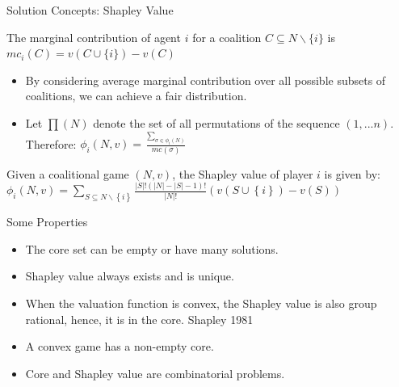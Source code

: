 \documentclass{beamer}
\begin{document}
%
\begin{frame}{Solution Concepts: Shapley Value}
    \begin{definition} \label{dfn:marginalcontribution}
        The {\color{blue}marginal contribution} of agent $i$ for a coalition $C \subseteq N \backslash \{i\}$ is $mc_i(C) = v(C \cup \{i\}) - v(C)$
    \end{definition}

    \begin{itemize}
        \item By considering average marginal contribution over all possible subsets of coalitions, we can achieve a fair distribution.\\
        \item Let $\prod(N)$ denote the set of all permutations of the sequence $(1,...n)$. Therefore: $\phi_i(N,v) = \frac{\sum_{\sigma \in \phi_i(N)}}{mc(\sigma)}$
    \end{itemize}

    \begin{definition} \label{dfn:shapleyvalue}
        Given a coalitional game $(N,v)$, the Shapley value of player $i$ is given by: \\
        $\phi_i(N,v) = \sum_{S \subseteq N \backslash \left\{i\right\} } \frac{|S|! (|N|-|S|-1)!}{|N|!} (v(S \cup \left\{i\right\}) - v(S))$
    \end{definition}
\end{frame}
\begin{frame}{Some Properties}
    \begin{itemize}
        \item The core set can be empty or have many solutions.
        \vspace{0.3cm}
        \item Shapley value always exists and is unique.
        \vspace{0.3cm}
        \item When the valuation function is {\color{blue}convex}, the Shapley value is also group rational, hence, it is in the {\color{blue}core}. {\color{blue}\lbrack Shapley 1981\rbrack}
        \vspace{0.3cm}
        \item A convex game has a non-empty core.
        \vspace{0.3cm}
        \item Core and Shapley value are combinatorial problems.
    \end{itemize}
\end{frame}
\end{document}
